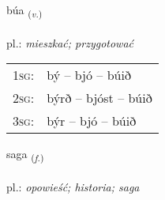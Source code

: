 \documentclass[frontgrid, backgrid]{flacards}\usepackage[]{graphicx}\usepackage[]{xcolor}
\begin{document}
\renewcommand{\flhead}{\vskip5pt \fboxsep=0pt {\small\bfseries\footnotesize Sagnorð | Verb}}
\renewcommand{\fcfoot}{\vskip5pt \fboxsep=0pt \hspace{2pt}{\small\bfseries\footnotesize 1K}}

\renewcommand{\blhead}{\vskip5pt {\small\bfseries\footnotesize Sagnorð | Verb }}
\renewcommand{\bcfoot}{\vskip5pt \hspace{2pt}{\small\bfseries\footnotesize 1K}}


{búa \small{\textsubscript{(\textit{v.})}} \\[1ex] %
\textphonetic{[puːa]} \\
pl.: \emph{mieszkać; przygotować} \\  [2ex]
\renewcommand*{\arraystretch}{0.8}
\begin{tabular}{p{1cm}l}
\textsc{1sg}: & bý -- bjó -- búið \\ 
\textsc{2sg}: & býrð -- bjóst -- búið \\ 
\textsc{3sg}: & býr -- bjó -- búið \\ 
\end{tabular}
}

\renewcommand{\flhead}{\vskip5pt \fboxsep=0pt {\small\bfseries\footnotesize Nafnorð | Noun}}
\renewcommand{\fcfoot}{\vskip5pt \fboxsep=0pt \hspace{2pt}{\small\bfseries\footnotesize 1K}}

\renewcommand{\blhead}{\vskip5pt {\small\bfseries\footnotesize Nafnorð | Noun }}
\renewcommand{\bcfoot}{\vskip5pt \hspace{2pt}{\small\bfseries\footnotesize 1K}}


{saga \small{\textsubscript{(\textit{f.})}} \\[1ex] %
\textphonetic{[saːɣa]} \\
pl.: \emph{opowieść; historia; saga} \\  [2ex]
\renewcommand*{\arraystretch}{0.8}
}
\end{document}
